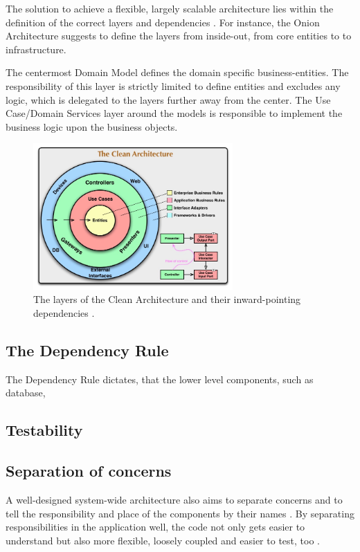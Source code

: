 \documentclass[conference]{IEEEtran}
\begin{document}
The solution to achieve a flexible, largely scalable architecture lies within the definition of the correct layers and dependencies \cite{cleanarchitecture} \cite{onionarchitecture}. For instance, the Onion Architecture \cite{onionarchitecture} suggests to define the layers from inside-out, from core entities to to infrastructure. 

The centermost Domain Model defines the domain specific business-entities. The responsibility of this layer is strictly limited to define entities and excludes any logic, which is delegated to the layers further away from the center. The Use Case/Domain Services layer around the models is responsible to implement the business logic upon the business objects. 

\begin{figure}[!t]
\centering
\includegraphics[width=3in]{images/cleanarchitecture.jpg}
\caption{The layers of the Clean Architecture and their inward-pointing dependencies \cite{cleanarchitecture}.}
\label{fig_sim}
\end{figure}

\subsection{The Dependency Rule}
The Dependency Rule dictates, that the lower level components, such as database, 

\subsection{Testability}

\subsection{Separation of concerns}
A well-designed system-wide architecture also aims to separate concerns and to tell the responsibility and place of the components by their names \cite{cleancode} \cite{cleanarchitecture} \cite{onionarchitecture}. By separating responsibilities in the application well, the code not only gets easier to understand but also more flexible, loosely coupled and easier to test, too \cite{cleancoder}. 
\end{document}

